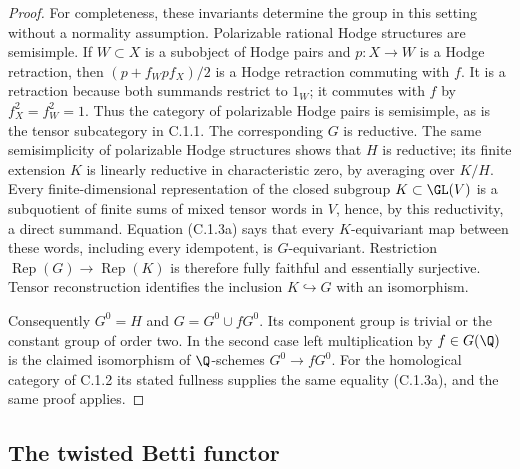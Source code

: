 \begin{proof}
For completeness, these invariants determine the group in this
setting without a normality assumption. Polarizable rational
Hodge structures are semisimple. If $W\subset X$ is a subobject
of Hodge pairs and $p:X\to W$ is a Hodge retraction, then
$(p+f_Wpf_X)/2$ is a Hodge retraction commuting with $f$.
It is a retraction because both summands restrict to $1_W$;
it commutes with $f$ by $f_X^2=f_W^2=1$. Thus the category of
polarizable Hodge pairs is semisimple, as is the tensor
subcategory in C.1.1. The corresponding $G$ is reductive.
The same semisimplicity of polarizable Hodge structures shows
that $H$ is reductive; its finite extension $K$ is linearly
reductive in characteristic zero, by averaging over $K/H$.
Every finite-dimensional representation of the closed subgroup
$K\subset\GL(V)$ is a subquotient of finite sums of mixed
tensor words in $V$, hence, by this reductivity, a direct
summand. Equation (C.1.3a) says that every $K$-equivariant map
between these words, including every idempotent, is
$G$-equivariant. Restriction $\operatorname{Rep}(G)\to
\operatorname{Rep}(K)$ is therefore fully faithful and
essentially surjective. Tensor reconstruction
\cite[Theorem 2.11]{DM1982} identifies the inclusion $K\hookrightarrow G$
with an isomorphism.

Consequently $G^0=H$ and $G=G^0\cup fG^0$. Its component
group is trivial or the constant group of order two. In the
second case left multiplication by $f\in G(\Q)$ is the
claimed isomorphism of $\Q$-schemes $G^0\to fG^0$.
For the homological category of C.1.2 its stated fullness
supplies the same equality (C.1.3a), and the same proof applies.
\end{proof}



\subsection{The twisted Betti functor}

